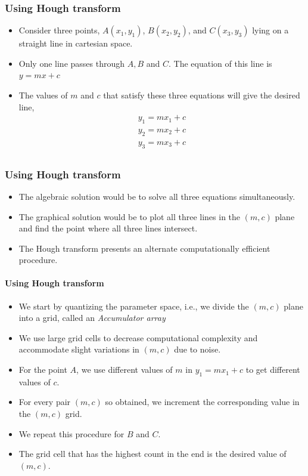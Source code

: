 \begin{frame}
\frametitle{Using Hough transform}
\logoCSIPCPL\mypagenum
	\begin{itemize}
		\item Consider three points, $A(x_1, y_1)$, $B (x_2, y_2)$, and $C (x_3, y_3)$ lying on a straight line in cartesian space.
		\item Only one line passes through $A, B$ and $C$.  The equation of this line is $y=mx + c$
		\item The values of $m$ and $c$ that satisfy these three equations will give the desired line,
		\begin{align*}	
			y_1=m x_1 + c\\
			y_2=m x_2 + c\\
			y_3=m x_3 + c\\
			\label{eqn:3equations}
		\end{align*}
	\end{itemize}
\end{frame}





\begin{frame}
\frametitle{Using Hough transform}
\logoCSIPCPL\mypagenum
	\begin{itemize}
		\item The algebraic solution would be to solve all three equations simultaneously.
		\item The graphical solution would be to plot all three lines in the $(m,c)$ plane and find the point where all three lines intersect.
		\item The Hough transform presents an alternate computationally efficient procedure.
	\end{itemize}
\end{frame}




\begin{frame}
\framesubtitle{Using Hough transform}
\logoCSIPCPL\mypagenum
	\begin{itemize}
		\item We start by quantizing the parameter space, i.e., we divide the $(m,c)$ plane into a grid, called an \emph{Accumulator array}
		\item We use large grid cells to decrease computational complexity and accommodate slight variations in $(m,c)$ due to noise.
		\item For the point $A$, we use different values of $m$ in $y_1=m x_1 + c$ to get different values of $c$.
		\item For every pair $(m,c)$ so obtained, we increment the corresponding value in the $(m,c)$ grid.
		\item We repeat this procedure for $B$ and $C$.
		\item The grid cell that has the highest count in the end is the desired value of $(m,c)$.
	\end{itemize}
\end{frame}






